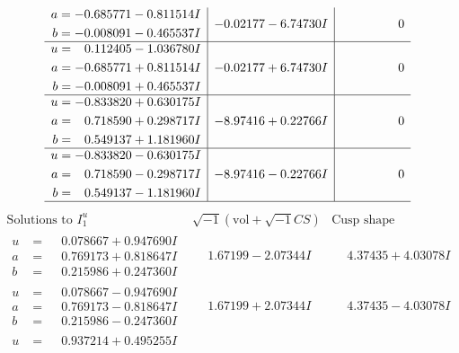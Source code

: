 \documentclass[1p]{elsarticle_modified}
\theoremstyle{definition}
\newcommand{\I}{\sqrt{-1}}
\begin{document}
$$\begin{array}{c|c|c}
\begin{aligned}
a &= -0.685771 - 0.811514 I \\
b &= -0.008091 - 0.465537 I\end{aligned}
 & -0.02177 - 6.74730 I & \phantom{-0.000000 } 0 \\ \hline\begin{aligned}
u &= \phantom{-}0.112405 - 1.036780 I \\
a &= -0.685771 + 0.811514 I \\
b &= -0.008091 + 0.465537 I\end{aligned}
 & -0.02177 + 6.74730 I & \phantom{-0.000000 } 0 \\ \hline\begin{aligned}
u &= -0.833820 + 0.630175 I \\
a &= \phantom{-}0.718590 + 0.298717 I \\
b &= \phantom{-}0.549137 + 1.181960 I\end{aligned}
 & -8.97416 + 0.22766 I & \phantom{-0.000000 } 0 \\ \hline\begin{aligned}
u &= -0.833820 - 0.630175 I \\
a &= \phantom{-}0.718590 - 0.298717 I \\
b &= \phantom{-}0.549137 - 1.181960 I\end{aligned}
 & -8.97416 - 0.22766 I & \phantom{-0.000000 } 0\\
 \hline 
 \end{array}$$\newpage$$\begin{array}{c|c|c}  
\text{Solutions to }I^u_{1}& \I (\text{vol} + \sqrt{-1}CS) & \text{Cusp shape}\\
 \hline 
\begin{aligned}
u &= \phantom{-}0.078667 + 0.947690 I \\
a &= \phantom{-}0.769173 + 0.818647 I \\
b &= \phantom{-}0.215986 + 0.247360 I\end{aligned}
 & \phantom{-}1.67199 - 2.07344 I & \phantom{-}4.37435 + 4.03078 I \\ \hline\begin{aligned}
u &= \phantom{-}0.078667 - 0.947690 I \\
a &= \phantom{-}0.769173 - 0.818647 I \\
b &= \phantom{-}0.215986 - 0.247360 I\end{aligned}
 & \phantom{-}1.67199 + 2.07344 I & \phantom{-}4.37435 - 4.03078 I \\ \hline\begin{aligned}
u &= \phantom{-}0.937214 + 0.495255 I \\

\end{aligned}
\end{array}$$
\end{document}
